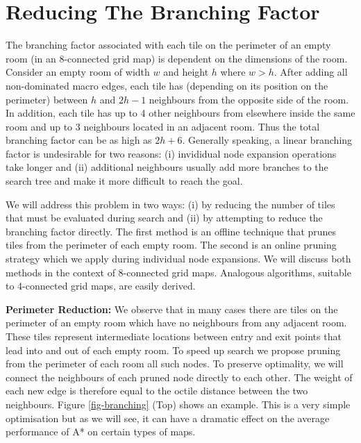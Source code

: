 \section{Reducing The Branching Factor}
The branching factor associated with each tile on the perimeter of an empty room (in an 8-connected 
grid map) is dependent on the dimensions of the room.
Consider an empty room of width $w$ and height $h$ where $w > h$.
After adding all non-dominated macro edges, each tile has (depending on its position on the perimeter) 
between $h$ and $2h - 1$ neighbours from the opposite side 
of the room. 
In addition, each tile has up to 4 other neighbours from elsewhere inside the same room and up to 3 neighbours located in
an adjacent room.
Thus the total branching factor can be as high as $2h + 6$.
Generally speaking, a linear branching factor is undesirable for two reasons:
(i) invididual node expansion operations take longer and (ii) additional neighbours usually 
add more branches to the search tree and make it more difficult to reach the goal.
\par
We will address this problem in two ways: (i) by reducing the number of tiles that must be evaluated during search and 
(ii) by attempting to reduce the branching factor directly.
The first method is an offline technique that prunes tiles from the perimeter of each empty room. 
The second is an online pruning strategy which we apply during individual node expansions.
We will discuss both methods in the context of 8-connected grid maps.
Analogous algorithms, suitable to 4-connected grid maps, are easily derived.
\par \noindent \newline
\textbf{Perimeter Reduction:}
We observe that in many cases there are tiles on the perimeter of an empty room which have no neighbours from any 
adjacent room. 
These tiles represent intermediate locations between entry and exit points that lead into and out of each empty room.
To speed up search we propose pruning from the perimeter of each room all such nodes.
To preserve optimality, we will connect the neighbours of each pruned node directly to each other.
The weight of each new edge is therefore equal to the octile distance between the two neighbours.
Figure \ref{fig-branching} (Top) shows an example.
This is a very simple optimisation but as we will see, it can have a dramatic effect on the average performance of
A* on certain types of maps.

